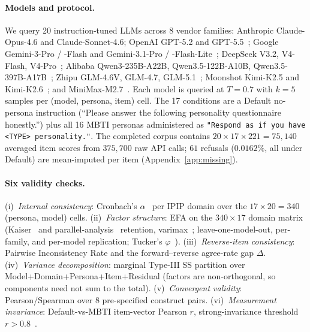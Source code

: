 \documentclass{article}
\begin{document}
\paragraph{Models and protocol.} We query 20 instruction-tuned LLMs across 8 vendor families: Anthropic Claude-Opus-4.6 and Claude-Sonnet-4.6; OpenAI GPT-5.2 and GPT-5.5~\citep{openai2023gpt4}; Google Gemini-3-Pro / -Flash and Gemini-3.1-Pro / -Flash-Lite~\citep{gemini2024v15}; DeepSeek V3.2, V4-Flash, V4-Pro~\citep{deepseek2024v3}; Alibaba Qwen3-235B-A22B, Qwen3.5-122B-A10B, Qwen3.5-397B-A17B~\citep{qwen2024qwen25}; Zhipu GLM-4.6V, GLM-4.7, GLM-5.1~\citep{glm2024chatglm}; Moonshot Kimi-K2.5 and Kimi-K2.6~\citep{moonshot2025kimi}; and MiniMax-M2.7~\citep{minimax2025minimax01}. Each model is queried at $T{=}0.7$ with $k{=}5$ samples per (model, persona, item) cell. The 17 conditions are a Default no-persona instruction (``Please answer the following personality questionnaire honestly.'') plus all 16 MBTI personas administered as \texttt{"Respond as if you have <TYPE> personality."}. The completed corpus contains $20 \times 17 \times 221 = 75{,}140$ averaged item scores from $375{,}700$ raw API calls; $61$ refusals ($0.0162\%$, all under Default) are mean-imputed per item (Appendix~\ref{app:missing}).

\paragraph{Six validity checks.} (i)~\emph{Internal consistency}: Cronbach's $\alpha$~\citep{cronbach1951coefficient} per IPIP domain over the $17 \times 20 = 340$ (persona, model) cells. (ii)~\emph{Factor structure}: EFA on the $340 \times 17$ domain matrix (Kaiser~\citep{kaiser1960application} and parallel-analysis~\citep{horn1965parallel} retention, varimax~\citep{kaiser1958varimax}; leave-one-model-out, per-family, and per-model replication; Tucker's $\varphi$~\citep{tucker1951method}). (iii)~\emph{Reverse-item consistency}: Pairwise Inconsistency Rate and the forward--reverse agree-rate gap $\Delta$. (iv)~\emph{Variance decomposition}: marginal Type-III SS partition over Model+Domain+Persona+Item+Residual (factors are non-orthogonal, so components need not sum to the total). (v)~\emph{Convergent validity}: Pearson/Spearman over 8 pre-specified construct pairs. (vi)~\emph{Measurement invariance}: Default-vs-MBTI item-vector Pearson $r$, strong-invariance threshold $r>0.8$~\citep{vandenberg2000review,meredith1993measurement}.
\end{document}
